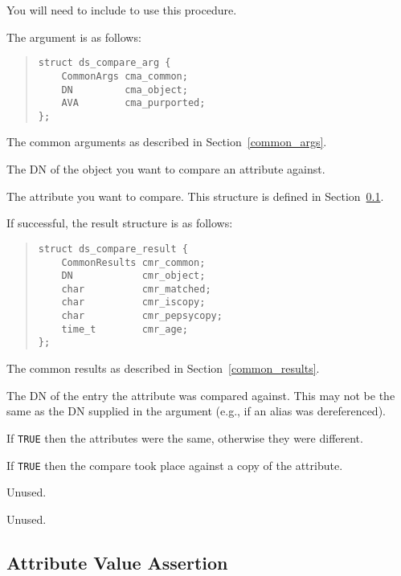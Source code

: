 You will need to include  to use this procedure.

The argument is as follows:
\begin{quote}\small\begin{verbatim}
struct ds_compare_arg {
    CommonArgs cma_common;
    DN         cma_object;
    AVA        cma_purported;
};
\end{verbatim}\end{quote}

\begin{describe}
\item [\verb"cma\_common":] The common arguments as described in
Section~\ref{common_args}.
\item [\verb"cma\_object":] The DN of the object you want to compare an 
attribute against.
\item [\verb"cma\_purported":] The attribute you want to compare.  This
structure is defined in Section~\ref{ava}.
\end{describe}

If successful, the result structure is as follows:
\begin{quote}\small\begin{verbatim}
struct ds_compare_result {
    CommonResults cmr_common;
    DN            cmr_object;
    char          cmr_matched; 
    char          cmr_iscopy; 
    char          cmr_pepsycopy;
    time_t        cmr_age;
};
\end{verbatim}\end{quote}

\begin{describe}
\item [\verb"cmr\_common":] The common results as described in
Section~\ref{common_results}.
\item [\verb"cmr\_object":] The DN of the entry the attribute was compared
against.  This may not be the same as the DN supplied in the argument (e.g.,
if an alias was dereferenced).
\item [\verb"cmr\_matched":] If \verb"TRUE" then the attributes were the
same, otherwise they were different.
\item [\verb"cmr\_iscopy":] If \verb"TRUE" then the compare took place
against a copy of the attribute.
\item [\verb"cmr\_pepsycopy":] Unused.
\item [\verb"cmr\_age":] Unused.
\end{describe}


\subsection {Attribute Value Assertion}
\label{ava}

